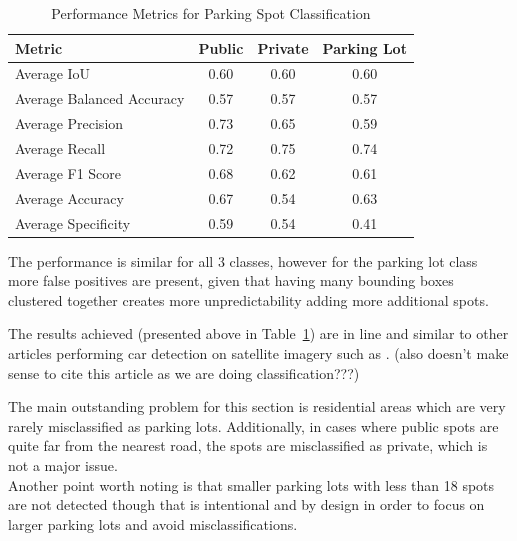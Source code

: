 \begin{table}[htbp]
  \centering
  \begin{tabular}{|l|c|c|c|}
    \hline
    \textbf{Metric}           & \textbf{Public} & \textbf{Private} & \textbf{Parking Lot} \\ \hline
    Average IoU               & 0.60            & 0.60             & 0.60                 \\ \hline
    Average Balanced Accuracy & 0.57            & 0.57             & 0.57                 \\ \hline
    Average Precision         & 0.73            & 0.65             & 0.59                 \\ \hline
    Average Recall            & 0.72            & 0.75             & 0.74                 \\ \hline
    Average F1 Score          & 0.68            & 0.62             & 0.61                 \\ \hline
    Average Accuracy          & 0.67            & 0.54             & 0.63                 \\ \hline
    Average Specificity       & 0.59            & 0.54             & 0.41                 \\ \hline
  \end{tabular}
  \caption{Performance Metrics for Parking Spot Classification}
  \label{tab:metrics3}
\end{table}

The performance is similar for all 3 classes, however for the parking lot class more false positives are present, given that having many bounding boxes clustered together creates more unpredictability adding more additional spots.

The results achieved (presented above in Table~\ref{tab:metrics3}) are in line and similar to other articles performing car detection on satellite imagery such as \cite{similarresults}.
(also doesn't make sense to cite this article as we are doing classification???)

The main outstanding problem for this section is residential areas which are very rarely misclassified as parking lots.
Additionally, in cases where public spots are quite far from the nearest road, the spots are misclassified as private, which is not a major issue.\\
Another point worth noting is that smaller parking lots with less than 18 spots are not detected though that is intentional and by design in order to focus on larger parking lots and avoid misclassifications.

